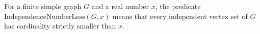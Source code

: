 \begin{definition}
For a finite simple graph $G$ and a real number $x$, the predicate
\(\mathrm{IndependenceNumberLess}(G,x)\) means that every independent vertex set
of \(G\) has cardinality strictly smaller than \(x\).
\end{definition}
